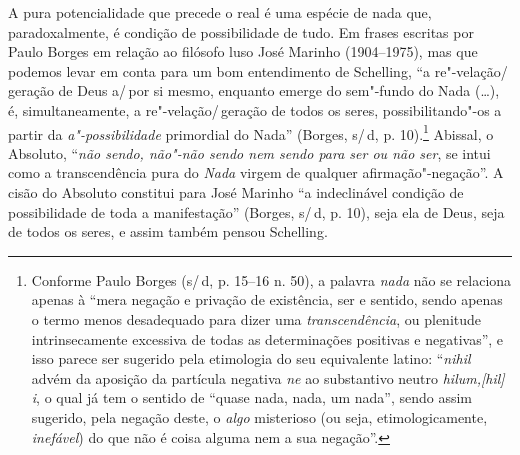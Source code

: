 A pura potencialidade que precede o real é uma espécie de nada
que, paradoxalmente, é condição de possibilidade de tudo. Em
frases escritas por Paulo Borges em relação ao filósofo luso
José Marinho (1904--1975), mas que podemos levar em conta para um
bom entendimento de Schelling, “a re"-velação/\,geração de Deus
a/\,por si mesmo, enquanto emerge do sem"-fundo do Nada (\ldots{}), é,
simultaneamente, a re"-velação/\,geração de todos os seres,
possibilitando"-os a partir da \emph{a"-possibilidade}
primordial do Nada” (Borges, s/\,d, p. 10).\footnote{ Conforme
Paulo Borges (s/\,d, p. 15--16 n. 50), a palavra \emph{nada} não
se relaciona apenas à “mera negação e privação de existência,
ser e sentido, sendo apenas o termo menos desadequado para dizer
uma \emph{transcendência}, ou plenitude intrinsecamente
excessiva de todas as determinações positivas e negativas”, e
isso parece ser sugerido pela etimologia do seu equivalente
latino: ``\emph{nihil} advém da aposição da partícula negativa
\emph{ne} ao substantivo neutro \emph{hilum,[hil] i}, o qual
já tem o sentido de ``quase nada, nada, um nada'', sendo assim
sugerido, pela negação deste, o \emph{algo} misterioso (ou
seja, etimologicamente, \emph{inefável}) do que não é coisa
alguma nem a sua negação”.} Abissal, o Absoluto, “\emph{não
sendo, não"-não sendo nem sendo para ser ou não ser}, se intui
como a transcendência pura do \emph{Nada} virgem de qualquer
afirmação"-negação”. A cisão do Absoluto constitui para José
Marinho “a indeclinável condição de possibilidade de toda a
manifestação” (Borges, s/\,d, p. 10), seja ela de Deus, seja de
todos os seres, e assim também pensou Schelling.

